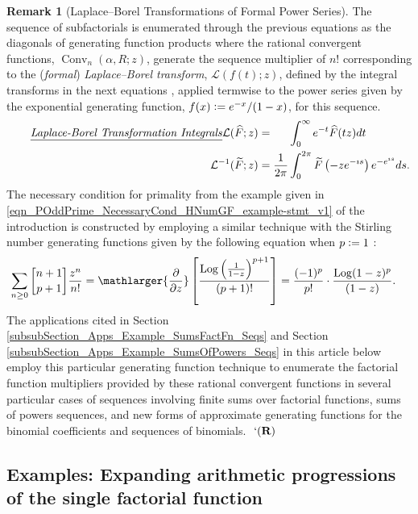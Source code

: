 \documentclass[12pt,reqno]{article}
\numberwithin{sfootnote}{section}
\numberwithin{equation}{section}
\newcommand{\tagtext}[1]{\tag*{\underline{\textit{#1}}}}
\theoremstyle{DefaultTheoremStyle}
\theoremstyle{definition}
\newtheorem{remark}[theorem]{Remark}
\newcommand{\eolqedsymbol}[1]{{\hrulefill\ensuremath{\ #1}}}
\renewcommand{\eolqedsymbol}[1]{{\mboxfill{ }\ensuremath{\ #1}}}
\newcommand{\RemarkQEDSymbol}{`(\text{\rm{\bf R}})}
\newcommand{\RemarkQED}{\eolqedsymbol{\RemarkQEDSymbol}}
\newcommand{\cf}[0]{cf.\ }
\newcommand{\defequals}{\ensuremath{\vcentcolon=}}
\newcommand{\gkpSI}[2]{\ensuremath{\genfrac{\lbrack}{\rbrack}{0pt}{}{#1}{#2}}}
\newcommand{\ConvGF}[4]{\ensuremath{\Conv_{#1}\left(#2, #3; #4\right)}}
\DeclareMathOperator{\Log}{Log}
\DeclareMathOperator{\Conv}{Conv}
\begin{document}
\begin{remark}[Laplace--Borel Transformations of Formal Power Series] 
\label{remark_Formal_Laplace-Borel_Transforms} 
The sequence of subfactorials is enumerated through the 
previous equations as the diagonals of generating function products 
where the rational convergent functions, $\ConvGF{n}{\alpha}{R}{z}$, 
generate the sequence multiplier of $n!$ 
corresponding to the (\emph{formal}) \emph{Laplace--Borel transform}, 
$\mathcal{L}(f(t); z)$, defined by the integral transforms in the next 
equations 
\citep[\cf \S 2.2]{FLAJOLET80B} 
\citep[\S B.4]{ACOMB-BOOK} \citep[p.\ 566]{GKP}, 
applied termwise to the power series given by the 
exponential generating function, $f(x) \defequals e^{-x} / (1-x)$, 
for this sequence. 
\begin{align*} 
\tagtext{Laplace-Borel Transformation Integrals} 
\mathcal{L}(\widehat{F}; z) & = 
     \phantom{\frac{1}{2\pi}} \int_0^{\infty} e^{-t} \widehat{F}(tz) dt \\ 
\mathcal{L}^{-1}(\widetilde{F}; z) & = 
     \frac{1}{2\pi} \int_0^{2\pi} 
     \widetilde{F}\left(-z e^{-\imath s}\right) 
     e^{-e^{\imath s}} ds. 
\end{align*} 
The necessary condition for primality from the example given in 
\eqref{eqn_POddPrime_NecessaryCond_HNumGF_example-stmt_v1} of the introduction 
is constructed by employing a similar technique with the 
Stirling number generating functions given by the following equation 
when $p \defequals 1$ \citep[\S 7.4]{GKP}: 
\begin{align*} 
\sum_{n \geq 0} \gkpSI{n+1}{p+1} \frac{z^{n}}{n!} & = 
     \mathlarger{\frac{\partial}{\partial z}} \left[ 
     \frac{\Log\left(\frac{1}{1-z}\right)^{p+1}}{(p+1)!} 
     \right] = 
     \frac{(-1)^{p}}{p!} \cdot \frac{\Log(1-z)^{p}}{(1-z)}. 
\end{align*} 
The applications cited in 
Section \ref{subsubSection_Apps_Example_SumsFactFn_Seqs} and 
Section \ref{subsubSection_Apps_Example_SumsOfPowers_Seqs} 
in this article below 
employ this particular generating function technique to enumerate the 
factorial function multipliers provided by 
these rational convergent functions in several particular cases of 
sequences involving finite sums over factorial functions, 
sums of powers sequences, and new forms of approximate 
generating functions for the binomial coefficients and 
sequences of binomials. 
\RemarkQED 
\end{remark} 

\subsection{Examples: Expanding arithmetic progressions of the 
            single factorial function} 
\label{subsubSection_Apps_ArithmeticProgs_of_the_SgFactFns} 
\end{document}
